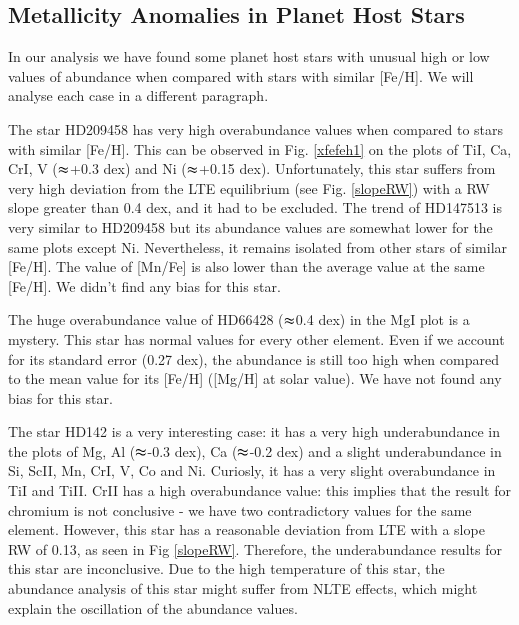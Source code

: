 \documentclass[dvips,12pt,a4paper]{report}
\begin{document}
{{\subsection{Metallicity Anomalies in Planet Host Stars}
\label {anomaly}
In our analysis we have found some planet host stars with unusual high or low values of abundance when compared with stars with similar [Fe/H]. We will analyse each case in a different paragraph. 

The star HD209458 has very high overabundance values when compared to stars with similar [Fe/H]. This can be observed in Fig. \ref{xfefeh1} on the plots of TiI, Ca, CrI, V ($\thickapprox$+0.3 dex) and Ni ($\thickapprox$+0.15 dex). Unfortunately, this star suffers from very high deviation from the LTE equilibrium (see Fig. \ref{slopeRW}) with a RW slope greater than 0.4 dex, and it had to be excluded. %
The trend of HD147513 is very similar to HD209458 but its abundance values are somewhat lower for the same plots except Ni. Nevertheless, it remains isolated from other stars of similar [Fe/H]. The value of [Mn/Fe] is also lower than the average value at the same [Fe/H]. We didn't find any bias for this star.

The huge overabundance value of HD66428 ($\thickapprox$0.4 dex) in the MgI plot is a mystery. This star has normal values for every other element. Even if we account for its standard error (0.27 dex), the abundance is still too high when compared to the mean value for its [Fe/H] ([Mg/H] at solar value). We have not found any bias for this star.

The star HD142 is a very interesting case: it has a very high underabundance in the plots of Mg, Al ($\thickapprox$-0.3 dex), Ca ($\thickapprox$-0.2 dex) and a slight underabundance in Si, ScII, Mn, CrI, V, Co and Ni. Curiosly, it has a very slight overabundance in TiI and TiII. CrII has a high overabundance value: this implies that the result for chromium is not conclusive - we have two contradictory values for the same element. However, this star has a reasonable deviation from LTE with a slope RW of 0.13, as seen in Fig \ref{slopeRW}. Therefore, the underabundance results for this star are inconclusive. Due to the high temperature of this star, the abundance analysis of this star might suffer from NLTE effects, which might explain the oscillation of the abundance values.

}}
\end{document}
